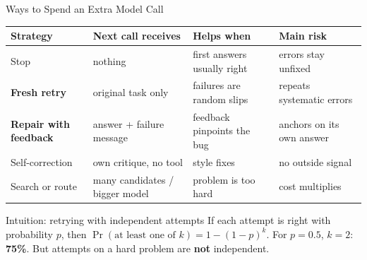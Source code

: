 \documentclass[aspectratio=169,11pt,t]{beamer}
\begin{document}
\begin{frame}{Ways to Spend an Extra Model Call}
\centering\footnotesize
\begin{tabular}{@{}p{2.7cm}p{3.2cm}p{3.3cm}p{3.3cm}@{}}
\toprule
\textbf{Strategy} & \textbf{Next call receives} & \textbf{Helps when} & \textbf{Main risk}\\
\midrule
Stop & nothing & first answers usually right & errors stay unfixed\\
\textbf{Fresh retry} & original task only & failures are random slips & repeats systematic errors\\
\textbf{Repair with feedback} & answer + failure message & feedback pinpoints the bug & anchors on its own answer\\
Self-correction & own critique, no tool & style fixes & no outside signal\\
Search or route & many candidates / bigger model & problem is too hard & cost multiplies\\
\bottomrule
\end{tabular}
\vspace{1em}
\begin{exbox}{Intuition: retrying with independent attempts}
If each attempt is right with probability $p$, then $\Pr(\text{at least one of } k) = 1-(1-p)^k$. For $p=0.5$, $k=2$: \textbf{75\%}. But attempts on a hard problem are \textbf{not} independent.
\end{exbox}
\end{frame}
\end{document}
